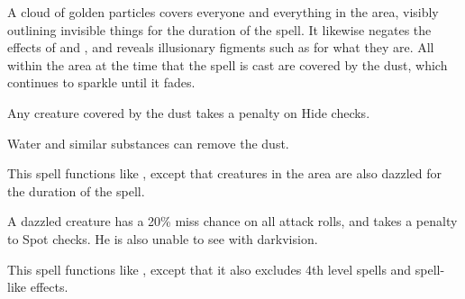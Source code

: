 \spellrng{\rngmed}
\spelldur{\durshort}
\begin{spelleffect}
  A cloud of golden particles covers everyone and everything in the area, visibly outlining invisible things for the duration of the spell. It likewise negates the effects of  and , and reveals illusionary figments such as  for what they are. All within the area at the time that the spell is cast are covered by the dust, which continues to sparkle until it fades.
  \par Any creature covered by the dust takes a  penalty on Hide checks.
\end{spelleffect}
\begin{spelleffect}
  Water and similar substances can remove the dust.
\end{spelleffect}

\begin{spelleffect}
  This spell functions like , except that creatures in the area are also dazzled for the duration of the spell.
\end{spelleffect}
\begin{spellnotes}
  A dazzled creature has a 20\% miss chance on all attack rolls, and takes a  penalty to Spot checks. He is also unable to see with darkvision.
\end{spellnotes}

\begin{spelleffect}
  This spell functions like , except that it also excludes 4th level spells and spell-like effects.
\end{spelleffect}


